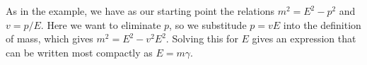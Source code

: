 As in the example, we have as our starting point the relations
$m^2=E^2-p^2$ and $v=p/E$. Here we want to eliminate $p$, so
we substitude $p=vE$ into the definition of mass, which gives
$m^2=E^2-v^2E^2$. Solving this for $E$ gives an expression that
can be written most compactly as $E=m\gamma$.
